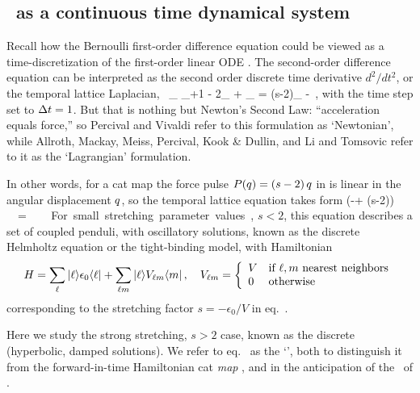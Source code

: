 \subsection{\tempLatt\ as a continuous time dynamical system}
\label{s:tempCatODE}

Recall how the Bernoulli first-order difference equation could be viewed as
a time-discretization of the first-order linear ODE . The
second-order difference equation  can be interpreted as the
second order discrete time derivative ${d^2}/{dt^2}$, or the temporal
lattice Laplacian,
\beq
\Box \, \ssp_\zeit \equiv
\ssp_{\zeit+1} - 2\ssp_{\zeit} + \ssp_{}
= (s-2)\ssp_{\zeit} -\Ssym{\zeit}
\,,
 with the time step set to $\Delta\zeit=1$.
But that is nothing but Newton's Second Law: ``acceleration equals
force,'' so Percival and Vivaldi refer to this formulation as
`Newtonian', while Allroth, Mackay, Meiss, Percival, Kook
\& Dullin, and Li and
Tomsovic refer  to it as the `Lagrangian' formulation.

In other words, for a cat map the force pulse $P(\coord)=(s-2)\,\coord$
in  is linear in the angular displacement $\coord$, so
the temporal lattice equation takes form
\beq
(-\Box + (s-2)\unit)\,\Xx = \Mm
\,.
For small stretching parameter values, $s<2$, this equation describes a
set of coupled penduli, with oscillatory solutions, known as the
discrete Helmholtz equation or the tight-binding model, with
Hamiltonian
\[ %
H=\sum_\ell\ket{\ell}\epsilon_0\bra{\ell}
  + \sum_{\ell m}\ket{\ell}V_{\ell m}\bra{m}
\,,\quad
   V_{\ell m} = \left\{
     \begin{array}{ll}
         V & \mbox{if\ } \ell,m \mbox{ nearest neighbors}\\
         0 & \mbox{otherwise}
     \end{array}
             \right.
\] %
corresponding to the stretching factor ${s}=-\epsilon_0/V$ in
eq.~.

Here we study the strong stretching, $s>2$ case, known as the discrete
{\em \sPe} (hyperbolic, damped solutions). We
refer to eq.~ as the `{\em \templatt}', both
to distinguish it from the forward-in-time Hamiltonian cat \emph{map}
, and in the anticipation of the \catlatt\ of
.

